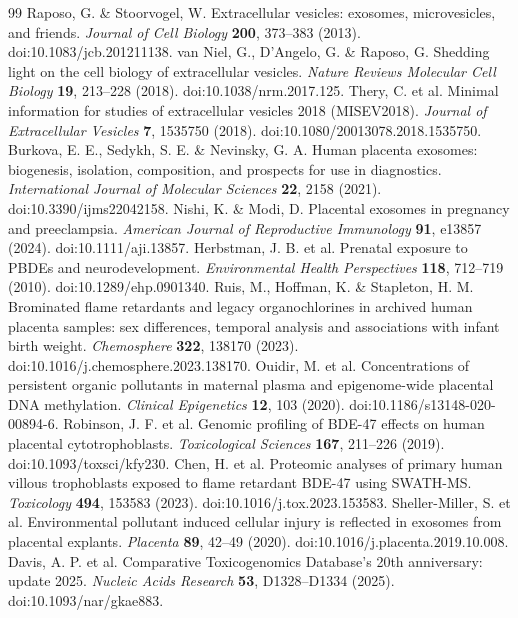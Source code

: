 \documentclass[11pt]{article}
\begin{document}
\begin{thebibliography}{99}
 Raposo, G. \& Stoorvogel, W. Extracellular vesicles: exosomes, microvesicles, and friends. \emph{Journal of Cell Biology} \textbf{200}, 373--383 (2013). doi:10.1083/jcb.201211138.
 van Niel, G., D'Angelo, G. \& Raposo, G. Shedding light on the cell biology of extracellular vesicles. \emph{Nature Reviews Molecular Cell Biology} \textbf{19}, 213--228 (2018). doi:10.1038/nrm.2017.125.
 Thery, C. et al. Minimal information for studies of extracellular vesicles 2018 (MISEV2018). \emph{Journal of Extracellular Vesicles} \textbf{7}, 1535750 (2018). doi:10.1080/20013078.2018.1535750.
 Burkova, E. E., Sedykh, S. E. \& Nevinsky, G. A. Human placenta exosomes: biogenesis, isolation, composition, and prospects for use in diagnostics. \emph{International Journal of Molecular Sciences} \textbf{22}, 2158 (2021). doi:10.3390/ijms22042158.
 Nishi, K. \& Modi, D. Placental exosomes in pregnancy and preeclampsia. \emph{American Journal of Reproductive Immunology} \textbf{91}, e13857 (2024). doi:10.1111/aji.13857.
 Herbstman, J. B. et al. Prenatal exposure to PBDEs and neurodevelopment. \emph{Environmental Health Perspectives} \textbf{118}, 712--719 (2010). doi:10.1289/ehp.0901340.
 Ruis, M., Hoffman, K. \& Stapleton, H. M. Brominated flame retardants and legacy organochlorines in archived human placenta samples: sex differences, temporal analysis and associations with infant birth weight. \emph{Chemosphere} \textbf{322}, 138170 (2023). doi:10.1016/j.chemosphere.2023.138170.
 Ouidir, M. et al. Concentrations of persistent organic pollutants in maternal plasma and epigenome-wide placental DNA methylation. \emph{Clinical Epigenetics} \textbf{12}, 103 (2020). doi:10.1186/s13148-020-00894-6.
 Robinson, J. F. et al. Genomic profiling of BDE-47 effects on human placental cytotrophoblasts. \emph{Toxicological Sciences} \textbf{167}, 211--226 (2019). doi:10.1093/toxsci/kfy230.
 Chen, H. et al. Proteomic analyses of primary human villous trophoblasts exposed to flame retardant BDE-47 using SWATH-MS. \emph{Toxicology} \textbf{494}, 153583 (2023). doi:10.1016/j.tox.2023.153583.
 Sheller-Miller, S. et al. Environmental pollutant induced cellular injury is reflected in exosomes from placental explants. \emph{Placenta} \textbf{89}, 42--49 (2020). doi:10.1016/j.placenta.2019.10.008.
 Davis, A. P. et al. Comparative Toxicogenomics Database's 20th anniversary: update 2025. \emph{Nucleic Acids Research} \textbf{53}, D1328--D1334 (2025). doi:10.1093/nar/gkae883.

\end{thebibliography}
\end{document}
